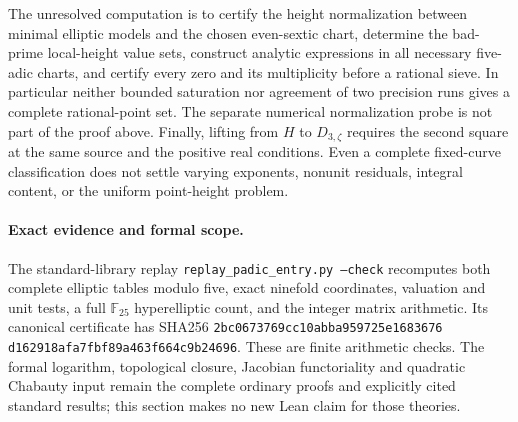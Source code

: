 The unresolved computation is to certify the height normalization
between minimal elliptic models and the chosen even-sextic chart,
determine the bad-prime local-height value sets, construct analytic
expressions in all necessary five-adic charts, and certify every zero
and its multiplicity before a rational sieve. In particular neither
bounded saturation nor agreement of two precision runs gives a
complete rational-point set. The separate numerical normalization
probe is not part of the proof above. Finally, lifting from \(H\) to
\(D_{3,\zeta}\) requires the second square at the same source and the
positive real conditions. Even a complete fixed-curve classification
does not settle varying exponents, nonunit residuals, integral content,
or the uniform point-height problem.

\paragraph{Exact evidence and formal scope.}
The standard-library replay
\texttt{replay\_padic\_\allowbreak entry.py --check}
recomputes both complete elliptic tables modulo five, exact ninefold
coordinates, valuation and unit tests, a full \(\mathbb F_{25}\)
hyperelliptic count, and the integer matrix arithmetic. Its canonical
certificate has SHA256
\texttt{2bc0673769cc10ab\allowbreak ba959725e1683676\allowbreak
d162918afa7fbf89\allowbreak a463f664c9b24696}.
These are finite arithmetic checks. The formal logarithm, topological
closure, Jacobian functoriality and quadratic Chabauty input remain the
complete ordinary proofs and explicitly cited standard results; this
section makes no new Lean claim for those theories.
